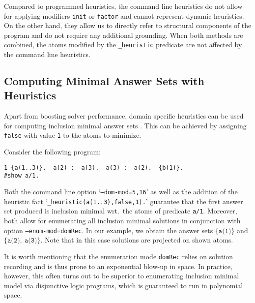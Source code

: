 Compared to programmed heuristics,
the command line heuristics do not allow for applying modifiers \texttt{init} or \texttt{factor}
and cannot represent dynamic heuristics.
On the other hand, they allow us to directly refer to structural components of the program
and do not require any additional grounding.
%
When both methods are combined,
the atoms modified by the \texttt{\_heuristic} predicate are not affected by the command line heuristics.

\subsection{Computing Minimal Answer Sets with Heuristics}

Apart from boosting solver performance,
domain specific heuristics can be used for computing inclusion minimal answer sets
\cite{cacacale96a,rogima10a}.
This can be achieved by assigning \texttt{false} with value \texttt{1} to the atoms to minimize. %
\begin{example}
Consider the following program:
\begin{lstlisting}[numbers=none]
1 {a(1..3)}.  a(2) :- a(3).  a(3) :- a(2).  {b(1)}.  
#show a/1.
\end{lstlisting}
Both the command line option `\texttt{--dom-mod=5,16}' as well as the addition of the heuristic fact
`\lstinline{_heuristic(a(1..3),false,1).}'
guarantee that the first answer set produced is inclusion minimal wrt.\ the atoms of predicate \texttt{a/1}.
Moreover, both allow for enumerating all inclusion minimal solutions in conjunction with option \texttt{--enum-mod=domRec}.
In our example, we obtain the answer sets
\(
\{\texttt{a(1)}\}
\)
and
\(
\{\texttt{a(2)},\ \texttt{a(3)}\}
\).
Note that in this case solutions are projected on shown atoms.
\end{example}
It is worth mentioning that the enumeration mode \texttt{domRec} relies on solution recording and is thus prone to an exponential blow-up in space.
In practice, however, this often turns out to be superior to enumerating inclusion minimal model via disjunctive logic programs,
which is guaranteed to run in polynomial space.

